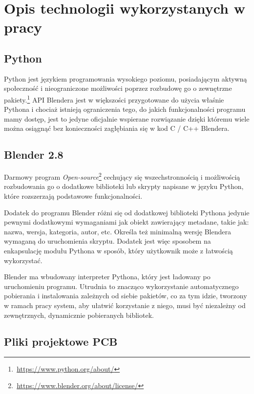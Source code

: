 \documentclass{xmgr}
\begin{document}
\newpage

\section {Opis technologii wykorzystanych w pracy}

\subsection{Python}
Python jest językiem programowania wysokiego poziomu, posiadającym aktywną społeczność i nieograniczone możliwości poprzez rozbudowę go o zewnętrzne pakiety.\footnote {\,\url{https://www.python.org/about/}} API Blendera jest w większości przygotowane do użycia właśnie Pythona i chociaż istnieją ograniczenia tego, do jakich funkcjonalności programu mamy dostęp, jest to jedyne oficjalnie wspierane rozwiązanie dzięki któremu wiele można osiągnąć bez konieczności zagłębiania się w kod C / C++ Blendera.

\subsection {Blender 2.8}
Darmowy program \emph{Open-source}\footnote{\,\url{https://www.blender.org/about/license/}} cechujący się wszechstronnością i możliwością rozbudowania go o dodatkowe biblioteki lub skrypty napisane w języku Python, które rozszerzają podstawowe funkcjonalności.

Dodatek do programu Blender różni się od dodatkowej biblioteki Pythona jedynie pewnymi dodatkowymi wymaganiami jak obiekt zawierający metadane, takie jak: nazwa, wersja, kategoria, autor, etc. Określa też minimalną wersję Blendera wymaganą do uruchomienia skryptu. Dodatek jest więc sposobem na enkapsulację modułu Pythona w sposób, który użytkownik może z łatwością wykorzystać.

Blender ma wbudowany interpreter Pythona, który jest ładowany po uruchomieniu programu. Utrudnia to znacząco wykorzystanie automatycznego pobierania i instalowania zależnych od siebie pakietów, co za tym idzie, tworzony w ramach pracy system, aby ułatwić korzystanie z niego, musi być niezależny od zewnętrznych, dynamicznie pobieranych bibliotek.


\subsection{Pliki projektowe PCB}
\end{document}
